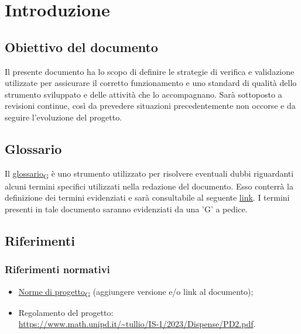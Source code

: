 \section{Introduzione}
\subsection{Obiettivo del documento}
Il presente documento ha lo scopo di definire le strategie di verifica e validazione utilizzate per assicurare il corretto funzionamento e uno standard di qualità dello strumento sviluppato e delle
attività che lo accompagnano.  Sarà sottoposto a revisioni continue, così da prevedere situazioni precedentemente non occorse e da seguire l'evoluzione del progetto.

\subsection{Glossario}
Il \href{https://7last.github.io/docs/rtb/documentazione-interna/glossario\#glossario}{glossario\textsubscript{G}} è uno strumento utilizzato per risolvere eventuali dubbi riguardanti
alcuni termini specifici utilizzati nella redazione del documento.
Esso conterrà la definizione dei termini evidenziati e sarà consultabile al seguente \href{https://7last.github.io/docs/rtb/documentazione-interna/glossario}{link}. I termini presenti in tale documento saranno evidenziati da una 'G' a pedice.

\subsection{Riferimenti}
\subsubsection{Riferimenti normativi}
\begin{itemize}
    \item \href{https://7last.github.io/docs/rtb/documentazione-interna/glossario#norme-di-progetto}{Norme di progetto\textsubscript{G}} (aggiungere versione e/o link al documento); %
    \item Regolamento del progetto:\\
		  \url{https://www.math.unipd.it/~tullio/IS-1/2023/Dispense/PD2.pdf}.
\end{itemize}
